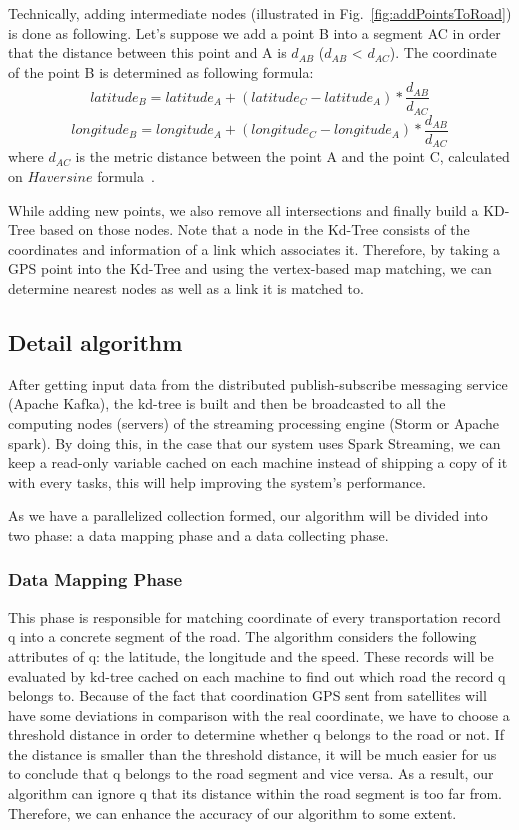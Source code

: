 \documentclass{acm_proc_article-sp}
\begin{document}
Technically, adding intermediate nodes (illustrated in Fig.~\ref{fig:addPointsToRoad}) is done as following. Let's suppose we add a point B into a segment AC in order that the distance between this point and A is $d_{AB}$ ($d_{AB}$ < $d_{AC}$). The coordinate of the point B is determined as following formula:
\[ latitude_{B} = latitude_{A} + (latitude_{C} - latitude_{A}) \ast \frac{d_{AB}}{d_{AC}}\]
\[ longitude_{B} = longitude_{A} + (longitude_{C} - longitude_{A}) \ast \frac{d_{AB}}{d_{AC}}\]
where $d_{AC}$ is the metric distance between the point A and the point C, calculated on $Haversine$ formula~\cite{haversineweb}.

While adding new points, we also remove all intersections and finally build a KD-Tree based on those nodes. Note that a node in the Kd-Tree consists of the coordinates and information of a link which associates it. Therefore, by taking a GPS point into the Kd-Tree and using the vertex-based map matching, we can determine nearest nodes as well as a link it is matched to.
	
\subsection{Detail algorithm}
		
After getting input data from the distributed publish-subscribe messaging service (Apache Kafka), the kd-tree is built and then be broadcasted to all the computing nodes (servers) of the streaming processing engine (Storm or Apache spark). By doing this, in the case that our system uses Spark Streaming, we can keep a read-only variable cached on each machine instead of shipping a copy of it with every tasks, this will help improving the system's performance.
	
As we have a parallelized collection formed, our algorithm will be divided into two phase: a data mapping phase and a data collecting phase. 

\subsubsection{Data Mapping Phase} 

This phase is responsible for matching coordinate of every transportation record q into a concrete segment of the road. The algorithm considers the following attributes of q: the latitude, the longitude and the speed. These records will be evaluated by kd-tree cached on each machine to find out which road the record q belongs to. Because of the fact that coordination GPS sent from satellites will have some deviations in comparison with the real coordinate, we have to choose a threshold distance in order to determine whether q belongs to the road or not. If the distance is smaller than the threshold distance, it will be much easier for us to conclude that q belongs to the road segment and vice versa. As a result, our algorithm can ignore q that its distance within the road segment is too far from. Therefore, we can enhance the accuracy of our algorithm to some extent.
\end{document}
